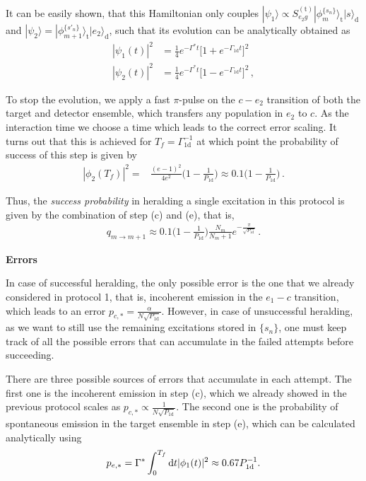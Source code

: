 \documentclass[twocolumn,pra,aps,superscriptaddress,showpacs]{revtex4-1}
\newcommand{\ket}[1]{|#1\rangle}
\def\oned{\mathrm{1d}}
\def\dd{\mathord{\rm d}}
\newcommand{\rd}{\mathrm{d}}
\newcommand{\rt}{\mathrm{t}}
\begin{document}
It can be easily shown, that this Hamiltonian only couples $\ket{\psi_1} \propto S_{e_2 g}^{(\rt)}\ket{\phi_m^{ \{ s_n\}}}_\rt \ket{s}_\rd$ and $\ket{\psi_2} = \ket{\phi_{m+1}^{ \{ s'_n\}} }_\rt \ket{e_2}_\rd$, such that its evolution can be analytically obtained as
%
\begin{align} \label{eqSM:probabilities2}
|\psi_1(t)|^2 
	&=\frac{1}{4}e^{-\Gamma^* t} \Big[ 1+e^{-\Gamma_\oned t}\Big]^2\,\\
|\psi_2(t)|^2 
	&=\frac{1}{4}e^{-\Gamma^* t} \Big[ 1-e^{-\Gamma_\oned t}\Big]^2\,,
\end{align}

To stop the evolution, we apply a fast $\pi$-pulse on the $c-e_2$ transition of both the target and detector ensemble, which transfers any population in $e_2$ to $c$. As the interaction time we choose a time which leads to the correct error scaling. It turns out that this is achieved for $T_f = \Gamma_\oned^{-1}$ at which point the probability of success of this step is given by
%
\begin{align}
|\phi_2(T_f)|^2 
	=& \frac{(e-1)^2}{4e^2}\big(1-\frac{1}{P_\oned}\big) 
	\approx 0.1\big(1-\frac{1}{P_\oned}\big)\,.
\end{align}

Thus, the \emph{success probability} in heralding a single excitation in this protocol is given by the combination of step (c) and (e), that is,
%
\begin{align}
q_{m\rightarrow m+1}
	\approx  0.1\big(1-\frac{1}{P_\oned}\big) \frac{N_m}{N_m+1}e^{-\frac{\pi}{\sqrt{P_\oned}}}\,.
\end{align}

\textbf{Errors}

In case of successful heralding, the only possible error is the one that we already considered in protocol 1, that is, incoherent emission in the $e_1-c$ transition, which leads to an error $p_{c,*}=\frac{\alpha}{N\sqrt{P_\oned}}$. However, in case of unsuccessful heralding, as we want to still use the remaining excitations stored in $\{s_n\}$, one must keep track of all the possible errors that can accumulate in the failed attempts before succeeding.

There are three possible sources of errors that accumulate in each attempt. The first one is the incoherent emission in step (c), which we already showed in the previous protocol scales as $p_{c,*}\propto \frac{1}{N\sqrt{P_\oned}}$. The second one is the probability of spontaneous emission in the target ensemble in step (e), which can be calculated analytically using
%
\begin{align}
p_{e,*}
	=\Gamma^* \int_{0}^{T_f} \dd t |\phi_1(t)|^2  
	\approx 0.67 P_\oned^{-1}.
\end{align}
\end{document}
